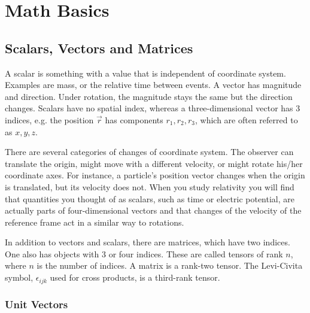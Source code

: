 \section{Math Basics}
\bigskip

\subsection{Scalars, Vectors and Matrices}

A scalar is something with a value that is independent of coordinate system. Examples are mass, or the relative time between events. A vector has magnitude and direction. Under rotation, the magnitude stays the same but the direction changes. Scalars have no spatial index, whereas a three-dimensional vector has 3 indices, e.g. the position $\vec{r}$ has components $r_1,r_2,r_3$, which are often referred to as $x,y,z$.

There are several categories of changes of coordinate system. The observer can translate the origin, might move with a different velocity, or might rotate his/her coordinate axes. For instance, a particle's position vector changes when the origin is translated, but its velocity does not. When you study relativity you will find that quantities you thought of as scalars, such as time or electric potential, are actually parts of four-dimensional vectors and that changes of the velocity of the reference frame act in a similar way to rotations.

In addition to vectors and scalars, there are matrices, which have two indices. One also has objects with 3 or four indices. These are called tensors of rank $n$, where $n$ is the number of indices. A matrix is a rank-two tensor. The Levi-Civita symbol, $\epsilon_{ijk}$ used for cross products, is a third-rank tensor.

\subsubsection*{Unit Vectors}

